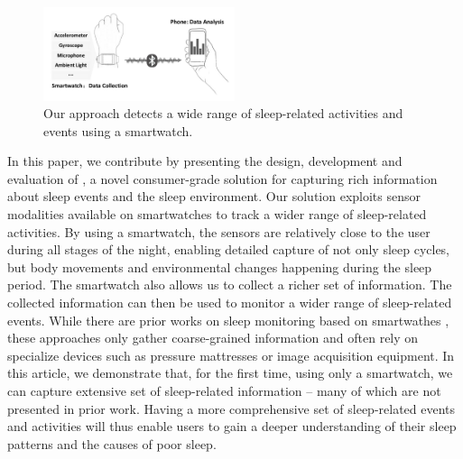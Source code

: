 \begin{figure}[!t]
\centering
\setlength{\belowcaptionskip}{-13pt}
      \includegraphics[width=0.5\textwidth]{Figures/datacollect.pdf}
  \caption{Our approach detects a wide range of sleep-related activities and events using a smartwatch.}\label{fig:datacollect}
\end{figure}


In this paper, we contribute by presenting the design, development and evaluation of \systemname, a novel consumer-grade solution for capturing rich information
about sleep events and the sleep environment. Our solution exploits sensor modalities available on smartwatches to track a wider range of sleep-related activities. By using a smartwatch,
the sensors are relatively close to the user during all stages of the night, enabling detailed capture of not only sleep cycles, but body movements and environmental changes happening during the sleep period.
The smartwatch also allows us to collect a richer set of information. The collected information can then be used to monitor a wider range of sleep-related events. While there are prior works on sleep monitoring
based on smartwathes \cite{pombo2016ubisleep,shelgikar2016sleep,haescher2015anomaly,borazio2012combining}, these approaches only gather
coarse-grained information and often rely on specialize devices such as pressure mattresses or image acquisition equipment. In this
article, we demonstrate that, for the first time, using only a smartwatch, we can capture extensive set of sleep-related information -- many of
which are not presented in prior work. Having a more comprehensive set of sleep-related events and activities will thus enable users to
gain a deeper understanding of their sleep patterns and the causes of poor sleep.


